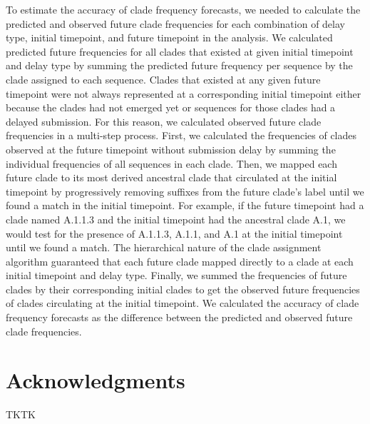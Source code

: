 \documentclass[9pt,lineno]{elife}
\begin{document}
To estimate the accuracy of clade frequency forecasts, we needed to calculate the predicted and observed future clade frequencies for each combination of delay type, initial timepoint, and future timepoint in the analysis.
We calculated predicted future frequencies for all clades that existed at given initial timepoint and delay type by summing the predicted future frequency per sequence by the clade assigned to each sequence.
Clades that existed at any given future timepoint were not always represented at a corresponding initial timepoint either because the clades had not emerged yet or sequences for those clades had a delayed submission.
For this reason, we calculated observed future clade frequencies in a multi-step process.
First, we calculated the frequencies of clades observed at the future timepoint without submission delay by summing the individual frequencies of all sequences in each clade.
Then, we mapped each future clade to its most derived ancestral clade that circulated at the initial timepoint by progressively removing suffixes from the future clade's label until we found a match in the initial timepoint.
For example, if the future timepoint had a clade named A.1.1.3 and the initial timepoint had the ancestral clade A.1, we would test for the presence of A.1.1.3, A.1.1, and A.1 at the initial timepoint until we found a match.
The hierarchical nature of the clade assignment algorithm guaranteed that each future clade mapped directly to a clade at each initial timepoint and delay type.
Finally, we summed the frequencies of future clades by their corresponding initial clades to get the observed future frequencies of clades circulating at the initial timepoint.
We calculated the accuracy of clade frequency forecasts as the difference between the predicted and observed future clade frequencies.

\section{Acknowledgments}

TKTK

\nocite{*} %

\end{document}
